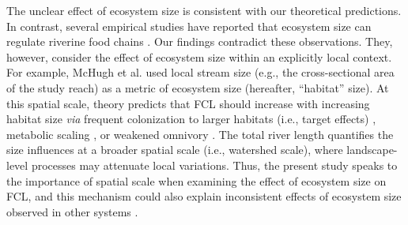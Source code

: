 \documentclass[11pt, class=article, crop=false]{standalone}
\begin{document}
The unclear effect of ecosystem size is consistent with our theoretical predictions.
In contrast, several empirical studies have reported that ecosystem size can regulate riverine food chains \citep{mchugh_dual_2010, mcintosh_capacity_2018, sabo_role_2010}.
Our findings contradict these observations.
They, however, consider the effect of ecosystem size within an explicitly local context.
For example, McHugh et al. \citep{mchugh_dual_2010} used local stream size (e.g., the cross-sectional area of the study reach) as a metric of ecosystem size (hereafter, ``habitat'' size).
At this spatial scale, theory predicts that FCL should increase with increasing habitat size \textit{via} frequent colonization to larger habitats (i.e., target effects) \citep{shibasaki_food_2024}, metabolic scaling \citep{mcintosh_capacity_2018}, or weakened omnivory \citep{ward_mechanistic_2017}.
The total river length quantifies the size influences at a broader spatial scale (i.e., watershed scale), where landscape-level processes may attenuate local variations. 
Thus, the present study speaks to the importance of spatial scale when examining the effect of ecosystem size on FCL, and this mechanism could also explain inconsistent effects of ecosystem size observed in other systems \citep{takimoto_environmental_2013}.

\noindent\makebox[\linewidth]{\rule{\textwidth}{0.4pt}}
\end{document}
